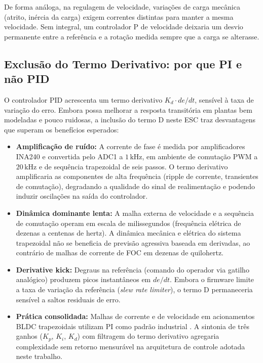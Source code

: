 De forma análoga, na regulagem de velocidade, variações de carga mecânica (atrito, inércia da carga) exigem correntes distintas para manter a mesma velocidade. Sem integral, um controlador P de velocidade deixaria um desvio permanente entre a referência e a rotação medida sempre que a carga se alterasse.

\subsection{Exclusão do Termo Derivativo: por que PI e não PID}

O controlador PID acrescenta um termo derivativo $K_d \cdot de/dt$, sensível à taxa de variação do erro. Embora possa melhorar a resposta transitória em plantas bem modeladas e pouco ruidosas, a inclusão do termo D neste ESC traz desvantagens que superam os benefícios esperados:

\begin{itemize}
    \item \textbf{Amplificação de ruído:} A corrente de fase é medida por amplificadores INA240 e convertida pelo ADC1 a $1\,\text{kHz}$, em ambiente de comutação PWM a $20\,\text{kHz}$ e de sequência trapezoidal de seis passos. O termo derivativo amplificaria as componentes de alta frequência (ripple de corrente, transientes de comutação), degradando a qualidade do sinal de realimentação e podendo induzir oscilações na saída do controlador.
    \item \textbf{Dinâmica dominante lenta:} A malha externa de velocidade e a sequência de comutação operam em escala de milissegundos (frequência elétrica de dezenas a centenas de hertz). A dinâmica mecânica e elétrica do sistema trapezoidal não se beneficia de previsão agressiva baseada em derivadas, ao contrário de malhas de corrente de FOC em dezenas de quilohertz.
    \item \textbf{Derivative kick:} Degraus na referência (comando do operador via gatilho analógico) produzem picos instantâneos em $de/dt$. Embora o firmware limite a taxa de variação da referência (\textit{slew rate limiter}), o termo D permaneceria sensível a saltos residuais de erro.
    \item \textbf{Prática consolidada:} Malhas de corrente e de velocidade em acionamentos BLDC trapezoidais utilizam PI como padrão industrial \cite{krishnan2010permanent, xia2012permanent, hanselman2003brushless}. A sintonia de três ganhos ($K_p$, $K_i$, $K_d$) com filtragem do termo derivativo agregaria complexidade sem retorno mensurável na arquitetura de controle adotada neste trabalho.
\end{itemize}

